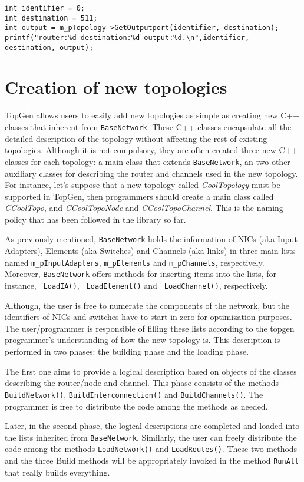 \documentclass[12pt,onecolumn]{report}
\begin{document}
\begin{lstlisting}
int identifier = 0;
int destination = 511;
int output = m_pTopology->GetOutputport(identifier, destination);
printf("router:%d destination:%d output:%d.\n",identifier, destination, output);
\end{lstlisting}

\section{Creation of new topologies}

TopGen allows users to easily add new topologies as simple as creating new C++ classes that inherent from \verb|BaseNetwork|. These C++ classes encapsulate all the detailed description of the topology without affecting the rest of existing topologies. Although it is not compulsory, they are often created three new C++ classes for each topology: a main class that extends \verb|BaseNetwork|, an two other auxiliary classes for describing the router and channels used in the new topology. For instance, let's suppose that a new topology called \textit{CoolTopology} must be supported in TopGen, then programmers should create a main class called \textit{CCoolTopo}, and \textit{CCoolTopoNode} and \textit{CCoolTopoChannel}. This is the naming policy that has been followed in the library so far.

As previously mentioned, \verb|BaseNetwork| holds the information of NICs (aka Input Adapters), Elements (aka Switches) and Channels (aka links) in three main lists named  \verb|m_pInputAdapters|, \verb|m_pElements| and \verb|m_pChannels|, respectively. Moreover, \verb|BaseNetwork| offers methods for inserting items into the lists, for instance, \verb|_LoadIA()|, \verb|_LoadElement()| and \verb|_LoadChannel()|, respectively. 

Although, the user is free to numerate the components of the network, but the identifiers of NICs and switches have to start in zero for optimization purposes. The user/programmer is responsible of filling these lists according to the topgen programmer's understanding of how the new topology is. This description is performed in two phases: the building phase and the loading phase. 

The first one aims to provide a logical description based on objects of the classes describing the router/node and channel. This phase consists of the methods \verb|BuildNetwork()|, \verb|BuildInterconnection()| and \verb|BuildChannels()|. The programmer is free to distribute the code among the methods as needed.

Later, in the second phase, the logical descriptions are completed and loaded into the lists inherited from \verb|BaseNetwork|. Similarly, the user can freely distribute the code among the methods \verb|LoadNetwork()| and \verb|LoadRoutes()|. These two methods and the three Build methods will be appropriately invoked in the method \verb|RunAll| that really builds everything.



\end{document}
